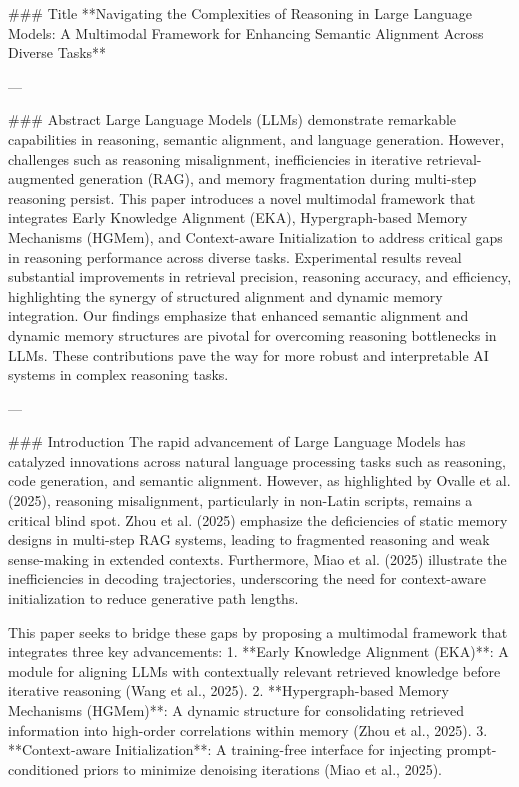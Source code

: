 ### Title  
**Navigating the Complexities of Reasoning in Large Language Models: A Multimodal Framework for Enhancing Semantic Alignment Across Diverse Tasks**

---

### Abstract  
Large Language Models (LLMs) demonstrate remarkable capabilities in reasoning, semantic alignment, and language generation. However, challenges such as reasoning misalignment, inefficiencies in iterative retrieval-augmented generation (RAG), and memory fragmentation during multi-step reasoning persist. This paper introduces a novel multimodal framework that integrates Early Knowledge Alignment (EKA), Hypergraph-based Memory Mechanisms (HGMem), and Context-aware Initialization to address critical gaps in reasoning performance across diverse tasks. Experimental results reveal substantial improvements in retrieval precision, reasoning accuracy, and efficiency, highlighting the synergy of structured alignment and dynamic memory integration. Our findings emphasize that enhanced semantic alignment and dynamic memory structures are pivotal for overcoming reasoning bottlenecks in LLMs. These contributions pave the way for more robust and interpretable AI systems in complex reasoning tasks.

---

### Introduction  
The rapid advancement of Large Language Models has catalyzed innovations across natural language processing tasks such as reasoning, code generation, and semantic alignment. However, as highlighted by Ovalle et al. (2025), reasoning misalignment, particularly in non-Latin scripts, remains a critical blind spot. Zhou et al. (2025) emphasize the deficiencies of static memory designs in multi-step RAG systems, leading to fragmented reasoning and weak sense-making in extended contexts. Furthermore, Miao et al. (2025) illustrate the inefficiencies in decoding trajectories, underscoring the need for context-aware initialization to reduce generative path lengths.

This paper seeks to bridge these gaps by proposing a multimodal framework that integrates three key advancements:
1. **Early Knowledge Alignment (EKA)**: A module for aligning LLMs with contextually relevant retrieved knowledge before iterative reasoning (Wang et al., 2025).
2. **Hypergraph-based Memory Mechanisms (HGMem)**: A dynamic structure for consolidating retrieved information into high-order correlations within memory (Zhou et al., 2025).
3. **Context-aware Initialization**: A training-free interface for injecting prompt-conditioned priors to minimize denoising iterations (Miao et al., 2025).

